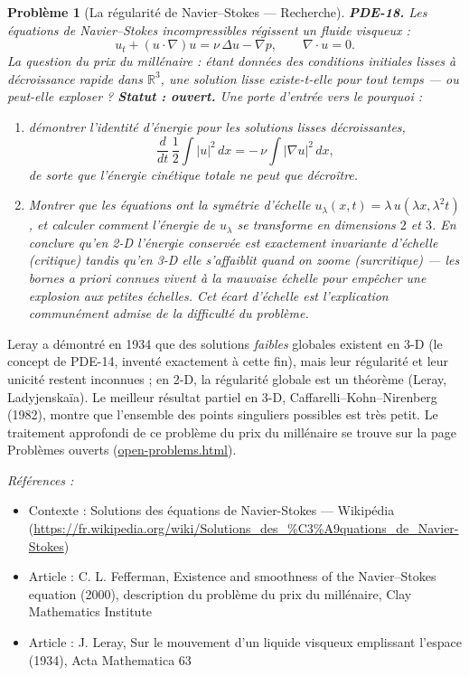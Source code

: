 \documentclass[11pt]{article}
\newtheorem{problem}{Problème}
\newenvironment{refs}{\par\small\noindent\emph{Références :}\begin{itemize}\setlength\itemsep{0pt}}{\end{itemize}\normalsize}
\begin{document}
\begin{problem}[{La régularité de Navier--Stokes --- Recherche}]
\textbf{PDE-18.} Les équations de Navier--Stokes incompressibles
régissent un fluide visqueux :
\[ u_t + (u \cdot \nabla)u = \nu\,\Delta u - \nabla p, \qquad \nabla \cdot u = 0. \]
La question du prix du millénaire : étant données des conditions initiales lisses à décroissance
rapide dans $\mathbb{R}^3$, une solution lisse existe-t-elle pour tout temps --- ou peut-elle
exploser ? \textbf{Statut : ouvert.} Une porte d'entrée vers le pourquoi :
\begin{enumerate}
\item[(a)] démontrer l'identité d'énergie pour les solutions lisses
décroissantes,
\[ \frac{d}{dt}\,\frac{1}{2}\int |u|^2\,dx = -\,\nu \int |\nabla u|^2\,dx, \]
de sorte que l'énergie cinétique totale ne peut que décroître.
\item[(b)] Montrer que les équations ont la
symétrie d'échelle $u_\lambda(x,t) = \lambda\,u(\lambda x, \lambda^2 t)$, et
calculer comment l'énergie de $u_\lambda$ se transforme en dimensions $2$ et $3$.
En conclure qu'en 2-D l'énergie conservée est exactement invariante d'échelle (critique)
tandis qu'en 3-D elle s'affaiblit quand on zoome (surcritique) --- les bornes a priori connues
vivent à la mauvaise échelle pour empêcher une explosion aux petites échelles. Cet écart d'échelle
est l'explication communément admise de la difficulté du problème.
\end{enumerate}

\end{problem}

\noindent Leray a démontré en 1934 que des solutions \textit{faibles} globales existent en
3-D (le concept de PDE-14, inventé exactement à cette fin), mais leur régularité et leur unicité
restent inconnues ; en 2-D, la régularité globale est un théorème (Leray, Ladyjenskaïa). Le
meilleur résultat partiel en 3-D, Caffarelli--Kohn--Nirenberg (1982), montre que l'ensemble des
points singuliers possibles est très petit. Le traitement approfondi de ce problème du prix du
millénaire se trouve sur la page Problèmes ouverts (\url{open-problems.html}).

\begin{refs}
\item Contexte : Solutions des équations de Navier-Stokes --- Wikipédia (\url{https://fr.wikipedia.org/wiki/Solutions_des_%C3%A9quations_de_Navier-Stokes})
\item Article : C. L. Fefferman, \og{} Existence and smoothness of the Navier--Stokes equation \fg{} (2000), description du problème du prix du millénaire, Clay Mathematics Institute
\item Article : J. Leray, \og{} Sur le mouvement d'un liquide visqueux emplissant l'espace \fg{} (1934), Acta Mathematica 63
\end{refs}
\end{document}
